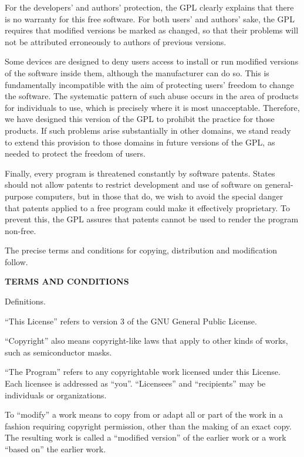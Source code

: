 For the developers' and authors' protection, the GPL clearly explains that there is no warranty for this free software.  For both users' and authors' sake, the GPL requires that modified versions be marked as changed, so that their problems will not be attributed erroneously to authors of previous versions.

Some devices are designed to deny users access to install or run modified versions of the software inside them, although the manufacturer can do so.  This is fundamentally incompatible with the aim of protecting users' freedom to change the software.  The systematic pattern of such abuse occurs in the area of products for individuals to use, which is precisely where it is most unacceptable.  Therefore, we have designed this version of the GPL to prohibit the practice for those products.  If such problems arise substantially in other domains, we stand ready to extend this provision to those domains in future versions of the GPL, as needed to protect the freedom of users.

Finally, every program is threatened constantly by software patents. States should not allow patents to restrict development and use of software on general-purpose computers, but in those that do, we wish to avoid the special danger that patents applied to a free program could make it effectively proprietary.  To prevent this, the GPL assures that patents cannot be used to render the program non-free.

The precise terms and conditions for copying, distribution and modification follow.

{\bf TERMS AND CONDITIONS}

\startitemize[n][start=0]

\item Definitions.

``This License'' refers to version 3 of the GNU General Public License.

``Copyright'' also means copyright-like laws that apply to other kinds of works, such as semiconductor masks.

``The Program'' refers to any copyrightable work licensed under this License.  Each licensee is addressed as ``you''.  ``Licensees'' and ``recipients'' may be individuals or organizations.

To ``modify'' a work means to copy from or adapt all or part of the work in a fashion requiring copyright permission, other than the making of an exact copy.  The resulting work is called a ``modified version'' of the earlier work or a work ``based on'' the earlier work.

